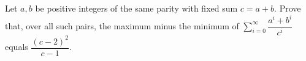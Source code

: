 Let $a,b$ be positive integers of the same parity with fixed sum $c=a+b$. Prove that, over all such pairs, the maximum minus the minimum of $\displaystyle\sum_{i=0}^{\infty}\dfrac{a^i+b^i}{c^i}$ equals $\dfrac{(c-2)^2}{c-1}$.
